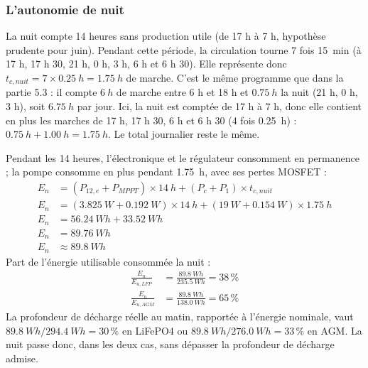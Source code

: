 \subsubsection*{L'autonomie de nuit}

La nuit compte 14 heures sans production utile (de 17 h à 7 h, hypothèse prudente pour juin). Pendant cette période, la circulation tourne 7 fois \qty{15}{min} (à 17 h, 17 h 30, 21 h, 0 h, 3 h, 6 h et 6 h 30). Elle représente donc $t_{c,nuit} = 7 \times \qty{0,25}{h} = \qty{1,75}{h}$ de marche. C'est le même programme que dans la partie 5.3 : il compte $\qty{6}{h}$ de marche entre 6 h et 18 h et $\qty{0,75}{h}$ la nuit (21 h, 0 h, 3 h), soit $\qty{6,75}{h}$ par jour. Ici, la nuit est comptée de 17 h à 7 h, donc elle contient en plus les marches de 17 h, 17 h 30, 6 h et 6 h 30 (4 fois \qty{0,25}{h}) : $\qty{0,75}{h} + \qty{1,00}{h} = \qty{1,75}{h}$. Le total journalier reste le même.

\begin{demonstration}
Pendant les 14 heures, l'électronique et le régulateur consomment en permanence ; la pompe consomme en plus pendant \qty{1,75}{h}, avec ses pertes MOSFET :
\begin{align*}
E_n &= (P_{12,e} + P_{MPPT}) \times \qty{14}{h} + (P_c + P_1) \times t_{c,nuit}\\
E_n &= (\qty{3,825}{W} + \qty{0,192}{W}) \times \qty{14}{h} + (\qty{19}{W} + \qty{0,154}{W}) \times \qty{1,75}{h}\\
E_n &= \qty{56,24}{Wh} + \qty{33,52}{Wh}\\
E_n &= \qty{89,76}{Wh}\\
E_n &\approx \qty{89,8}{Wh}
\end{align*}
Part de l'énergie utilisable consommée la nuit :
\begin{align*}
\frac{E_n}{E_{u,LFP}} &= \frac{\qty{89,8}{Wh}}{\qty{235,5}{Wh}} = 38\,\%\\
\frac{E_n}{E_{u,AGM}} &= \frac{\qty{89,8}{Wh}}{\qty{138,0}{Wh}} = 65\,\%
\end{align*}
La profondeur de décharge réelle au matin, rapportée à l'énergie nominale, vaut $\qty{89,8}{Wh}/\qty{294,4}{Wh} = 30\,\%$ en LiFePO4 ou $\qty{89,8}{Wh}/\qty{276,0}{Wh} = 33\,\%$ en AGM. La nuit passe donc, dans les deux cas, sans dépasser la profondeur de décharge admise.
\end{demonstration}

